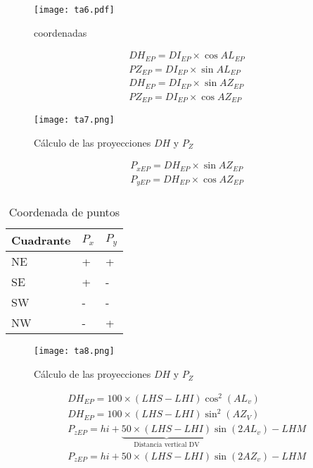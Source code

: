 \begin{figure}[h!]
  \centerline{\texttt{[image: ta6.pdf]}}
  \caption{coordenadas}
  \label{ta6}
\end{figure}

\begin{align}
    &DH_{EP}=DI_{EP}\times \cos{AL_{EP}}\\ 
    &PZ_{EP}=DI_{EP}\times \sin{AL_{EP}}\\
    &DH_{EP}=DI_{EP}\times \sin{AZ_{EP}}\\
    &PZ_{EP}=DI_{EP}\times \cos{AZ_{EP}}
\end{align}

\begin{figure}[h!]
    \centerline{\texttt{[image: ta7.png]}}
    \caption{Cálculo de las proyecciones $DH$ y $P_Z$}
    \label{ta7}
\end{figure}

\begin{align}
    &P_{xEP}=DH_{EP}\times \sin{AZ_{EP}}\\
    &P_{yEP}=DH_{EP}\times \cos{AZ_{EP}}\\
\end{align}

\begin{table}[h!]
    \centering
    \begin{tabular}{@{}lll@{}}
        \toprule
        Cuadrante & $P_x$  & $P_y$ \\ \midrule
        NE        & +      & +     \\
        SE        & +      & -     \\
        SW        & -      & -     \\
        NW        & -      & +     \\ \bottomrule
    \end{tabular}
    \caption{Coordenada de puntos}
    \label{tabta4}
    \end{table}


\begin{figure}[h!]
    \centerline{\texttt{[image: ta8.png]}}
    \caption{Cálculo de las proyecciones $DH$ y $P_Z$}
    \label{ta8}
\end{figure}

\begin{align}
    &DH_{EP}=100\times \left(LHS-LHI\right)\cos^2{(AL_v)}\\
    &DH_{EP}=100\times \left(LHS-LHI\right)\sin^2{(AZ_V)}\\
    &P_{zEP}=hi+\underbrace{50\times \left(LHS-LHI\right)}_{\text{Distancia vertical DV}}\sin{(2AL_v)}-LHM\\
    &P_{zEP}=hi+50\times \left(LHS-LHI\right)\sin{(2AZ_v)}-LHM
\end{align}

